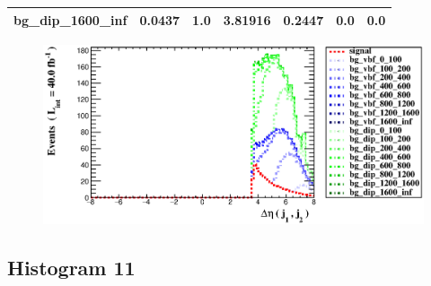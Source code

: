 \documentclass[a4paper, 10pt]{article}
\begin{document}
\begin{table}[H]
\begin{center}
\begin{tabular}{|m{23.0mm}|m{23.0mm}|m{18.0mm}|m{19.0mm}|m{19.0mm}|m{19.0mm}|m{19.0mm}|}
      \hline
      {\cellcolor{white}         bg\_dip\_1600\_inf}& {\cellcolor{white}         0.0437}& {\cellcolor{white}         1.0}& {\cellcolor{white}         3.81916}& {\cellcolor{white}         0.2447}& {\cellcolor{green}         0.0}& {\cellcolor{green}         0.0}\\
\hline
    \end{tabular}
  \end{center}
\end{table}

\begin{figure}[H]
  \begin{center}
    \includegraphics[scale=0.45]{selection_9.eps}\\
\caption{   }
  \end{center}
\end{figure}
      \newpage
\subsection{ Histogram 11}
\end{document}
